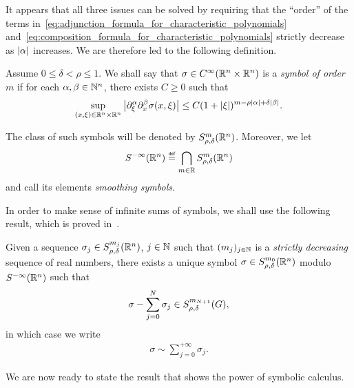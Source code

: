 It appears that all three issues can be solved by requiring
that the ``order'' of the terms in~\eqref{eq:adjunction_formula_for_characteristic_polynomials} and~\eqref{eq:composition_formula_for_characteristic_polynomials} strictly decrease as $\abs \alpha$ increases.
We are therefore led to the following definition.
\begin{definition}
    Assume $0 \leq \delta < \rho \leq 1$.
    We shall say that $\sigma \in \SmoothFunctions {\R^n \times \R^n}$ is a \emph{symbol of order $m$}
    if for each $\alpha, \beta \in \N^n$,
    there exists $C \geq 0$ such that
    \begin{align*}
        \sup_{(x, \xi) \in \R^n \times \R^n} \abs {\iD{\xi^\alpha} \iD{x^\beta}\sigma(x, \xi)} \leq C (1 + \abs \xi)^{m - \rho \abs \alpha + \delta \abs \beta}.
    \end{align*}

    The class of such symbols will be denoted by $\SymbolClass [\R^n] m {\rho, \delta}$.
    Moreover, we let
    \begin{align*}
        \SmoothingSymbols [\R^n] \defeq \bigcap_{m \in \R} \SymbolClass [\R^n] m {\rho, \delta}
    \end{align*}
    and call its elements \emph{smoothing symbols}.
\end{definition}

In order to make sense of infinite sums of symbols,
we shall use the following result,
which is proved in~\cite[Proposition~2.5.33]{RuzhanskyTurunen10}.

\begin{lemma}
    Given a sequence $\sigma_j \in \SymbolClass [\R^n] {m_j} {\rho, \delta}$, $j \in \N$ such that $(m_j)_{j \in \N}$ is a \emph{strictly decreasing} sequence of real numbers,
    there exists a unique symbol $\sigma \in \SymbolClass [\R^n] {m_0} {\rho, \delta}$ modulo $\SmoothingSymbols [\R^n]$ such that
    \begin{align*}
        \sigma - \sum_{j = 0}^N \sigma_j \in \SymbolClass {m_{N + 1}} {\rho, \delta},
    \end{align*}
    in which case we write
    \begin{align*}
        \sigma \sim \sum_{j = 0}^{+\infty} \sigma_j.
    \end{align*}
\end{lemma}

We are now ready to state the result
that shows the power of symbolic calculus.


